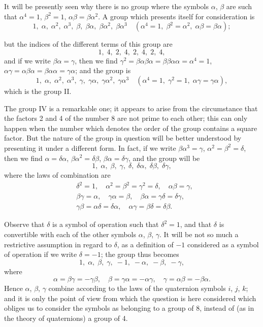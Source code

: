 \documentclass[11pt,a4paper]{article}
\begin{document}
It will be presently seen why there is no group where the symbols $\alpha$, $\beta$ are such that $\alpha^{4} = 1$, $\beta^{2} = 1$, $\alpha\beta = \beta\alpha^{2}$. A group which presents itself for consideration is
\[
1,\; \alpha,\; \alpha^{2},\; \alpha^{3},\; \beta,\; \beta\alpha,\; \beta\alpha^{2},\; \beta\alpha^{3} \quad (\alpha^{4} = 1,\; \beta^{2} = \alpha^{2},\; \alpha\beta = \beta\alpha);
\]

\setcounter{page}{89}

but the indices of the different terms of this group are
\[
1,\; 4,\; 2,\; 4,\; 2,\; 4,\; 2,\; 4,
\]
and if we write $\beta\alpha = \gamma$, then we find $\gamma^{2} = \beta\alpha\beta\alpha = \beta\beta\alpha\alpha = \alpha^{4} = 1$, $\alpha\gamma = \alpha\beta\alpha = \beta\alpha\alpha = \gamma\alpha$; and the group is
\[
1,\; \alpha,\; \alpha^{2},\; \alpha^{3},\; \gamma,\; \gamma\alpha,\; \gamma\alpha^{2},\; \gamma\alpha^{3} \quad (\alpha^{4} = 1,\; \gamma^{2} = 1,\; \alpha\gamma = \gamma\alpha),
\]
which is the group II.

The group IV is a remarkable one; it appears to arise from the circumstance that the factors 2 and 4 of the number 8 are not prime to each other; this can only happen when the number which denotes the order of the group contains a square factor. But the nature of the group in question will be better understood by presenting it under a different form. In fact, if we write $\beta\alpha^{3} = \gamma$, $\alpha^{2} = \beta^{2} = \delta$, then we find $\alpha = \delta\alpha$, $\beta\alpha^{2} = \delta\beta$, $\beta\alpha = \delta\gamma$, and the group will be
\[
1,\; \alpha,\; \beta,\; \gamma,\; \delta,\; \delta\alpha,\; \delta\beta,\; \delta\gamma,
\]
where the laws of combination are
\[
\begin{aligned}
&\delta^{2} = 1,\quad \alpha^{2} = \beta^{2} = \gamma^{2} = \delta, \quad \alpha\beta = \gamma, \\
&\beta\gamma = \alpha,\quad \gamma\alpha = \beta, \quad \beta\alpha = \gamma\delta = \delta\gamma, \\
&\gamma\beta = \alpha\delta = \delta\alpha, \quad \alpha\gamma = \beta\delta = \delta\beta.
\end{aligned}
\]

Observe that $\delta$ is a symbol of operation such that $\delta^{2} = 1$, and that $\delta$ is convertible with each of the other symbols $\alpha$, $\beta$, $\gamma$. It will be not so much a restrictive assumption in regard to $\delta$, as a definition of $-1$ considered as a symbol of operation if we write $\delta = -1$; the group thus becomes
\[
1,\; \alpha,\; \beta,\; \gamma,\; -1,\; -\alpha,\; -\beta,\; -\gamma,
\]
where
\[
\alpha = \beta\gamma = -\gamma\beta, \quad \beta = \gamma\alpha = -\alpha\gamma, \quad \gamma = \alpha\beta = -\beta\alpha.
\]
Hence $\alpha$, $\beta$, $\gamma$ combine according to the laws of the quaternion symbols $i$, $j$, $k$; and it is only the point of view from which the question is here considered which obliges us to consider the symbols as belonging to a group of 8, instead of (as in the theory of quaternions) a group of 4.
\end{document}
